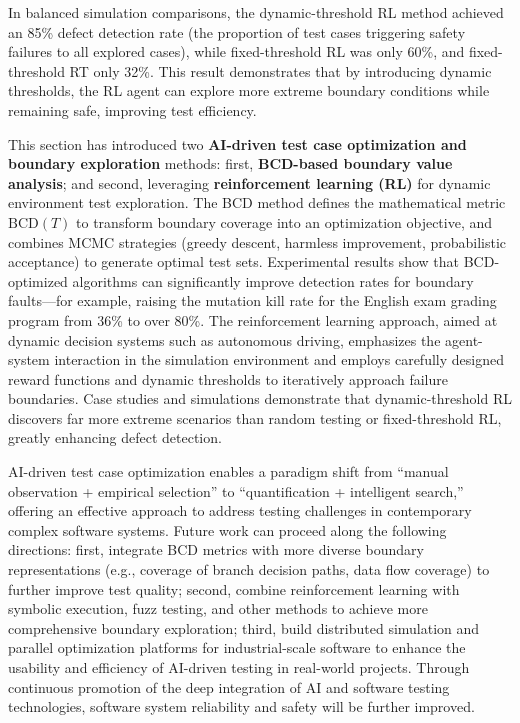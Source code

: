 \documentclass[manuscript,screen,review]{acmart}
\begin{document}
In balanced simulation comparisons, the dynamic-threshold RL method achieved an 85\% defect detection rate (the proportion of test cases triggering safety failures to all explored cases), while fixed-threshold RL was only 60\%, and fixed-threshold RT only 32\%. This result demonstrates that by introducing dynamic thresholds, the RL agent can explore more extreme boundary conditions while remaining safe, improving test efficiency.

This section has introduced two \textbf{AI-driven test case optimization and boundary exploration} methods: first, \textbf{BCD-based boundary value analysis}; and second, leveraging \textbf{reinforcement learning (RL)} for dynamic environment test exploration. The BCD method defines the mathematical metric $\mathrm{BCD}(T)$ to transform boundary coverage into an optimization objective, and combines MCMC strategies (greedy descent, harmless improvement, probabilistic acceptance) to generate optimal test sets. Experimental results show that BCD-optimized algorithms can significantly improve detection rates for boundary faults---for example, raising the mutation kill rate for the English exam grading program from 36\% to over 80\%. The reinforcement learning approach, aimed at dynamic decision systems such as autonomous driving, emphasizes the agent-system interaction in the simulation environment and employs carefully designed reward functions and dynamic thresholds to iteratively approach failure boundaries. Case studies and simulations demonstrate that dynamic-threshold RL discovers far more extreme scenarios than random testing or fixed-threshold RL, greatly enhancing defect detection.

AI-driven test case optimization enables a paradigm shift from ``manual observation + empirical selection'' to ``quantification + intelligent search,'' offering an effective approach to address testing challenges in contemporary complex software systems. Future work can proceed along the following directions: first, integrate BCD metrics with more diverse boundary representations (e.g., coverage of branch decision paths, data flow coverage) to further improve test quality; second, combine reinforcement learning with symbolic execution, fuzz testing, and other methods to achieve more comprehensive boundary exploration; third, build distributed simulation and parallel optimization platforms for industrial-scale software to enhance the usability and efficiency of AI-driven testing in real-world projects. Through continuous promotion of the deep integration of AI and software testing technologies, software system reliability and safety will be further improved.
\end{document}
